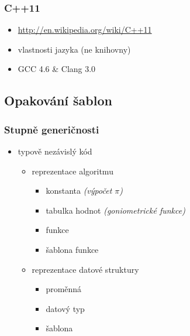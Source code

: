 \begin{frame} \frametitle{C++11}
	\begin{itemize}
		\item{\url{http://en.wikipedia.org/wiki/C++11}}
		\item{vlastnosti jazyka (ne knihovny)}
		\item{GCC 4.6 \& Clang 3.0}
	\end{itemize}
\end{frame}

\subsection{Opakování šablon}

\begin{frame} \frametitle{Stupně generičnosti}
	\begin{itemize}
		\item{typově nezávislý kód}
		\begin{itemize}
			\item{reprezentace algoritmu}
			\begin{itemize}
				\item{konstanta \textit{(výpočet $\pi$)}} \pause
				\item{tabulka hodnot \textit{(goniometrické funkce)}} \pause
				\item{funkce} \pause
				\item{šablona funkce} \pause
			\end{itemize}
			\item{reprezentace datové struktury}
			\begin{itemize}
				\item{proměnná} \pause
				\item{datový typ} \pause
				\item{šablona}
			\end{itemize}
		\end{itemize}
	\end{itemize}
\end{frame}

